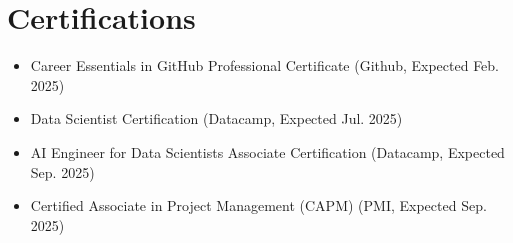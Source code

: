 \documentclass[letterpaper,11pt]{article}
\newcommand{\resumeItem}[1]{
  \item\small{
    {#1 \vspace{-2pt}}
  }
}
\newcommand{\resumeSubHeadingListStart}{\begin{itemize}[leftmargin=0.15in, label={}]}
\newcommand{\resumeSubHeadingListEnd}{\end{itemize}}
\begin{document}
\section{Certifications}
  \resumeSubHeadingListStart
    
    \resumeItem{Career Essentials in GitHub Professional Certificate (Github, Expected Feb. 2025)}
    
    \resumeItem{Data Scientist Certification (Datacamp, Expected Jul. 2025)}
    
    \resumeItem{AI Engineer for Data Scientists Associate Certification (Datacamp, Expected Sep. 2025)}
    
    \resumeItem{Certified Associate in Project Management (CAPM) (PMI, Expected Sep. 2025)}
    
  \resumeSubHeadingListEnd


\end{document}

